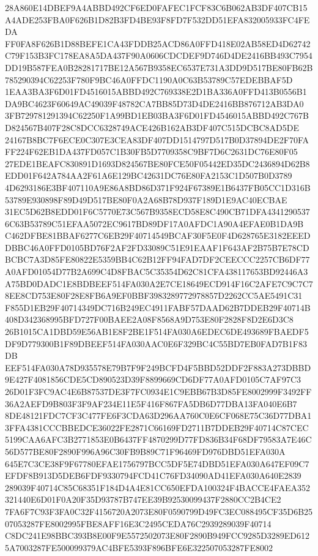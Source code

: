 \documentclass[UTF8,fontset=fandol,zihao=-4,a4paper]{ctexart}
\begin{document}
{{28A860E14DBEF9A4ABBD492CF6ED0FAFEC1FCF83C6B062AB3DF407CB15A4ADE253FBA0F626B1D82B3FD4BE93F8FD7F532DD51EFA832005933FC4FEDA
FF0FA8F626B1D88BEFE1CA43FDDB25ACD86A0FFD418E02AB58ED4D62742C79F153B3FC178EA8A5DA437F90A0606CDCDEF9D746D4DE2416BB493C7954
DD19B587FEA0B28281717BE12A567B9358EC6537E731A3DD9D517BE80FB62B785290394C62253F780F9BC46A0FFDC1190A0C63B53789C57EDEBBAF5D
1EAA3BA3F6D01FD4516015ABBD492C769338E2D1BA336A0FFD413B0556B1DA9BC4623F60649AC49039F48782CA7BB85D73D4DE2416BB876712AB3DA0
3FB729781291394C62250F1A99BD1EB03BA3F6D01FD4546015ABBD492C767BD824567B407F28C8DCC6328749ACE426B162AB3DF407C515DCBC8AD5DE
24167B8BC7F6ECE0C307E3CEA83DF407DD1514797D517B0D37894DE2F70FAFF224F62EB1DA437FD057C1B30FB5D7709358C9BF7D6C2631DC76E80F05
27EDE1BEAFC830891D1693D824567BE80FCE50F05442ED35DC2436894D62B8EDD01F642A784AA2F61A6E129BC42631DC76E80FA2153C1D507B0D3789
4D6293186E3BF407110A9E86A8BD86D371F924F67389E1B6437FB05CC1D316B53789E930898F89D49D517BE80F0A2A68B78D937F189D1E9AC40ECBAE
31EC5D62B8EDD01F6C5770E73C567B9358ECD58E8C490CB71DFA43412905376C63B53789C51EFAA5072EC9617BD89DF17A0AFDC1A90A4EFAE0B1DA9B
C462DFBE81BBAF6277C6EB29F40714549BCAF30F5E0F4D628765E3182EEEDDBBC46A0FFD0105BD76F2AF2FD33089C51E91EAAF1F643AF2B75B7E78CD
BCBC7A3D85FE80822E5359BB4C62B12FF94FAD7DF2CEECCC2257CB6DF77A0AFD01054D77B2A699C4D8FBAC5C35354D62C81CFA438117653BD92446A3
A75BD0DADC1E8BDBEEF514FA030A2E7CE18649ECD914F16C2AFE7C9C7C78EE8CD753E80F28E8FB6A9EF0BBF3983289772978857D2262CC5AE5491C31
F855D1EB29F40714349DC716B249EC4911FABF57DAAD62B7DDEB29F40714B408D342368995BFD727F00BAEE2A08F8568A9D753E80F2828F8D2E6D3C8
26B1015CA1DBD59E56AB1E8F2BE1F514FA030A6EDEC6DE493689FBAEDF5DF9D779300B1F89DBEEF514FA030AAC0E6F329BC4C55BD7EB0FAD7B1F83DB
EEF514FA030A78D935578E79B7F9F249BCFD4F5BBD52DDF2F883A273DBBD9E427F4081856CDE5CD890523D39F8899669CD6DF77A0AFD0105C7AF97C3
26D01F3FC9AC4E6B87537DE3F7FC0934E1C9EBB67B3D85FE8002999F3492FF36A2AEFD9B803F3F9AF234E11E5F416F867FA5DB6D77DBA13FA040E6B7
8DE48121FDC7CF3C477FE6F3CDA63D296AA760C0E6CF068E75C36D77DBA13FFA4381CCCBBEDCE36022FE2871C66169FD2711B7DDEB29F40714C87CEC
5199CAA6AFC3B2771853E0B6437FF4870299D77FD836B34F68DF79583A7E46C56D577BE80F2890F996A96C30FB9B89C71F96469FD976DBD51EFA030A
645E7C3CE38F9F67780EFAE1756797BCC5DF5E74DBD51EFA030A647EF09C7EFDF8B913D5DEB6FDF9330794FCD41C76FD34090AD41EFA030A640E2839
289039F40714C85C68351F184D4A4E81CC650EFDA100324F4BACCE4FAEA352321440E6D01F0A20F35D93787B747EE39B92530099437F2880CC2B4CE2
7FA6F7C93F3FA0C32F4156720A2073E80F0590799D49FC3EC088495CF35D6B2507053287FE8002995FBE8AFF16E3C2495CEDA76C2939289039F40714
C8DC241E98BBC393B8E00F9E5572502073E80F2890B949FCC9285D3289ED6125A7003287FE500099379AC4BFE5393F896BFE6E322507053287FE8002
}}
\end{document}
